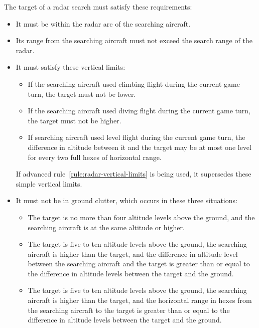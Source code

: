{The target of a radar search must satisfy these requirements:

    \begin{itemize}

    \item It must be within the radar arc of the searching aircraft.

    \item Its range from the searching aircraft must not exceed the search range of the radar.

    \item It must satisfy these vertical limits:
    \begin{itemize}
        \item If the searching aircraft used climbing flight during the current game turn, the target must not be lower.
        \item If the searching aircraft used diving flight during the current game turn, the target must not be higher.
        \item If searching aircraft used level flight during the current game turn, the difference in altitude between it and the target may be at most one level for every two full hexes of horizontal range.
    \end{itemize}

    If advanced rule~\ref{rule:radar-vertical-limits} is being used, it supersedes these simple vertical limits.

    \item It must not be in ground clutter, which occurs in these three situations:

    \begin{itemize}
        \item The target is no more than four altitude levels above the ground, and the searching aircraft is at the same altitude or higher.
        \item The target is five to ten altitude levels above the ground, the searching aircraft is higher than the target, and the difference in altitude level between the searching aircraft and the target is greater than or equal to the difference in altitude levels between the target and the ground.
        \item The target is five to ten altitude levels above the ground, the searching aircraft is higher than the target, and the horizontal range in hexes from the searching aircraft to the target is greater than or equal to the difference in altitude levels between the target and the ground.
        

\end{itemize}
\end{itemize}}
